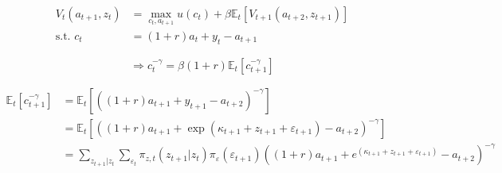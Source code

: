 \documentclass[11pt]{article}
\begin{document}
\begin{equation*}
\begin{split}
 V_{t}(a_{t+1}, z_t) &= \max_{c_t,a_{t+1}} u(c_{t}) + \beta \mathbb{E}_t[V_{t+1}(a_{t+2}, z_{t+1})] \\
 \text{s.t. } c_t &= (1+r) a_{t}+y_t - a_{t+1}
\end{split}
\end{equation*}

$$ \Rightarrow c_t^{-\gamma} = \beta (1+r) \mathbb{E}_t [c_{t+1}^{-\gamma}] $$

\begin{equation*}
\begin{split}
\mathbb{E}_t [c_{t+1}^{-\gamma}] &=
      \mathbb{E}_t [\left( (1+r)a_{t+1} + y_{t+1} - a_{t+2} \right)^{-\gamma}] \\
      &= \mathbb{E}_t [\left((1+r)a_{t+1} + \exp(\kappa_{t+1} + z_{t+1} + \varepsilon_{t+1}) - a_{t+2} \right)^{-\gamma}] \\
      &= \sum_{z_{t+1}|z_t} \sum_{\varepsilon_t} \pi_{z,t}(z_{t+1}|z_t) \pi_\varepsilon(\varepsilon_{t+1}) \left((1+r)a_{t+1} + e^{(\kappa_{t+1} + z_{t+1} + \varepsilon_{t+1})} - a_{t+2} \right)^{-\gamma}
\end{split}
\end{equation*}


\end{document}
